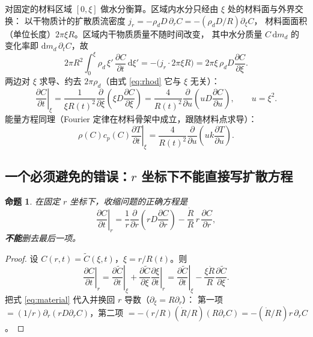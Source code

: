\documentclass[11pt,a4paper]{article}
\newtheorem{proposition}{命题}
\theoremstyle{definition}
\begin{document}
对固定的材料区域 $[0,\xi]$ 做水分衡算。区域内水分只经由 $\xi$ 处的材料面与外界交换：
以干物质计的扩散质流密度 $j_r=-\rho_dD\,\partial_rC=-(\rho_dD/R)\partial_\xi C$，
材料面面积（单位长度）$2\pi\xi R$。区域内干物质质量不随时间改变，
其中水分质量 $C\,\mathrm{d}m_d$ 的变化率即 $\mathrm{d}m_d\,\partial_tC$，故
\[
2\pi R^2\int_0^\xi \rho_d\,\xi'\,\frac{\partial C}{\partial t}\,\mathrm{d}\xi'
=-\big(j_r\cdot2\pi\xi R\big)=2\pi\xi\,\rho_dD\frac{\partial C}{\partial\xi}.
\]
两边对 $\xi$ 求导、约去 $2\pi\rho_d$（由式 \eqref{eq:rhod} 它与 $\xi$ 无关）：
\begin{equation}
\boxed{\;\left.\frac{\partial C}{\partial t}\right|_\xi
=\frac{1}{\xi R(t)^2}\frac{\partial}{\partial\xi}\!\left(\xi D\frac{\partial C}{\partial\xi}\right)
=\frac{4}{R(t)^2}\frac{\partial}{\partial u}\!\left(uD\frac{\partial C}{\partial u}\right),
\qquad u=\xi^2 .\;}
\label{eq:material}
\end{equation}
能量方程同理（Fourier 定律在材料骨架中成立，跟随材料点求导）：
\begin{equation}
\rho(C)c_p(C)\left.\frac{\partial T}{\partial t}\right|_\xi
=\frac{4}{R(t)^2}\frac{\partial}{\partial u}\!\left(uk\frac{\partial T}{\partial u}\right).
\label{eq:energy_mat}
\end{equation}

\subsection{一个必须避免的错误：$r$ 坐标下不能直接写扩散方程}

\begin{proposition}
在固定 $r$ 坐标下，收缩问题的正确方程是
\begin{equation}
\left.\frac{\partial C}{\partial t}\right|_r
=\frac{1}{r}\frac{\partial}{\partial r}\!\left(rD\frac{\partial C}{\partial r}\right)
-\frac{\dot R}{R}\,r\,\frac{\partial C}{\partial r},
\label{eq:r_with_adv}
\end{equation}
\textbf{不能}删去最后一项。
\end{proposition}

\begin{proof}
设 $C(r,t)=\tilde C(\xi,t)$，$\xi=r/R(t)$。则
\[
\left.\frac{\partial C}{\partial t}\right|_r
=\left.\frac{\partial \tilde C}{\partial t}\right|_\xi
+\frac{\partial \tilde C}{\partial \xi}\left.\frac{\partial \xi}{\partial t}\right|_r
=\left.\frac{\partial \tilde C}{\partial t}\right|_\xi
-\frac{\xi\dot R}{R}\frac{\partial \tilde C}{\partial \xi}.
\]
把式 \eqref{eq:material} 代入并换回 $r$ 导数（$\partial_\xi=R\partial_r$）：
第一项 $=(1/r)\partial_r(rD\partial_rC)$，第二项
$=-(r/R)(\dot R/R)(R\partial_rC)=-(\dot R/R)r\,\partial_rC$。
\end{proof}
\end{document}
